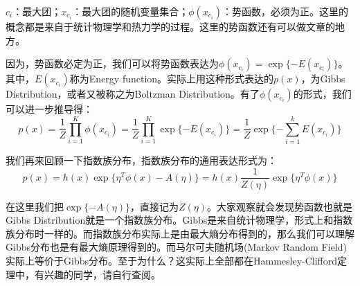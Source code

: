 \documentclass[a4paper]{article}
\begin{document}
$c_i$：最大团；$x_{c_i}$：最大团的随机变量集合；$\phi(x_{c_i})$：势函数，必须为正。这里的概念都是来自于统计物理学和热力学的过程。这里的势函数还有可以做文章的地方。

因为，势函数必定为正，我们可以将势函数表达为$\phi(x_{c_i}) = \exp\{ -E(x_{c_i}) \}$。其中，$E(x_{c_i})$称为Energy function。实际上用这种形式表达的$p(x)$，为Gibbs Distribution，或者又被称之为Boltzman Distribution。有了$\phi(x_{c_i})$的形式，我们可以进一步推导得：
\begin{equation}
    p(x) = \frac{1}{Z}\prod_{i=1}^K\phi(x_{c_i}) = \frac{1}{Z}\prod_{i=1}^K \exp\{ -E(x_{c_i}) \} = \frac{1}{Z}\exp\{ - \sum_{i=1}^k E(x_{c_i}) \}
\end{equation}

我们再来回顾一下指数族分布，指数族分布的通用表达形式为：
\begin{equation}
    p(x) = h(x)\exp\{ \eta^T\phi(x) - A(\eta) \} = h(x)\frac{1}{Z(\eta)}\exp\{ \eta^T\phi(x)\}
\end{equation}

在这里我们把$\exp\{ - A(\eta) \}$，直接记为$Z(\eta)$。大家观察就会发现势函数也就是Gibbs Distribution就是一个指数族分布。Gibbs是来自统计物理学，形式上和指数族分布时一样的。而指数族分布实际上是由最大熵分布得到的，那么我们可以理解Gibbs分布也是有最大熵原理得到的。而马尔可夫随机场(Markov Random Field)实际上等价于Gibbs分布。至于为什么？这实际上全部都在Hammesley-Clifford定理中，有兴趣的同学，请自行查阅。
\end{document}
